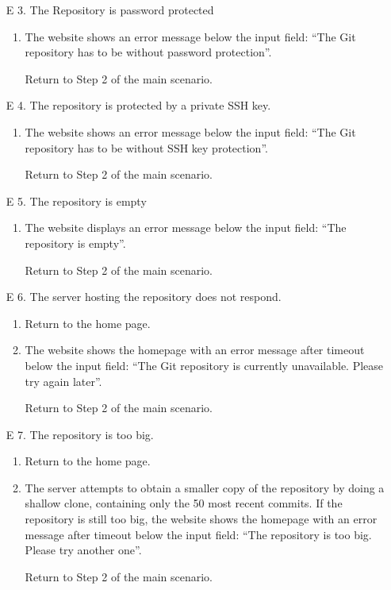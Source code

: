 \documentclass[11pt]{scrartcl}
\begin{document}
\begin{description}[leftmargin=!,labelwidth=\widthof{\bfseries Frequency of use:}]
\begin{enumerate}[leftmargin=1.5em]
			\item[E 3.] The Repository is password protected
				\begin{enumerate}
					\item The website shows an
						error message below the input field: \enquote{The Git repository has to be without 
						password protection}.
					\item[] Return to Step 2 of the main scenario.
				\end{enumerate}
				
			\item[E 4.] The repository is protected by a private SSH key.
				\begin{enumerate}
					\item The website shows an error message below the input field: \enquote{The Git repository 
							has to be without SSH key protection}.
					\item[] Return to Step 2 of the main scenario.
				\end{enumerate}
				
			\item[E 5.] The repository is empty
				\begin{enumerate}
					\item  The website displays an error message below the input field: \enquote{The repository is empty}.
					\item[] Return to Step 2 of the main scenario.
				\end{enumerate}	
										
			\item[E 6.] The server hosting the repository does not respond.
				\begin{enumerate}
					\item Return to the home page.
					\item The website shows the homepage with an error message after timeout below the input 	
						field: 	\enquote{The Git repository is currently unavailable. Please try again later}.
					\item[] Return to Step 2 of the main scenario.
					
				\end{enumerate}
				
			\item[E 7.] The repository is too big.
				\begin{enumerate}
					\item Return to the home page.
					\item The server attempts to obtain a 
						smaller copy of the repository by doing a shallow clone, containing only
						the 50 most recent commits. If the repository is still too big, the
						website shows the homepage with an error message after timeout below the input 	
						field: \enquote{The repository is too big. Please try another one}.
					\item[] Return to Step 2 of the main scenario.
				\end{enumerate}
		\end{enumerate}


\end{description}
\end{document}
